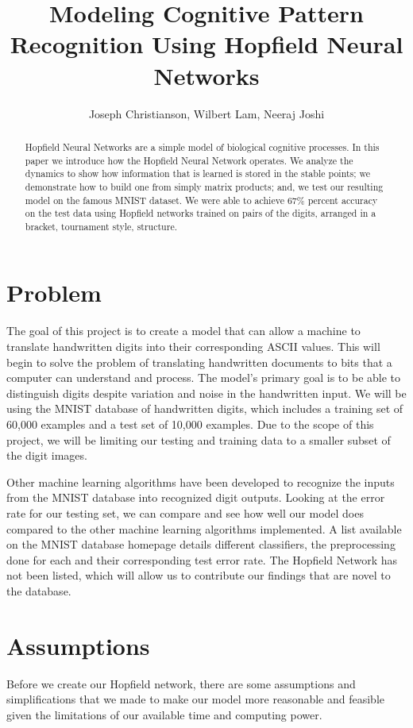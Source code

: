 \documentclass[]{article}
\title{Modeling Cognitive Pattern Recognition Using Hopfield Neural Networks}
\author{Joseph Christianson, Wilbert Lam, Neeraj Joshi}
\theoremstyle{plain}
\theoremstyle{definition}
\begin{document}
\maketitle

\begin{abstract}
Hopfield Neural Networks are a simple model of biological cognitive processes. In this paper we introduce how the Hopfield Neural Network operates. We analyze the dynamics to show how information that is learned is stored in the stable points; we demonstrate how to build one from simply matrix products; and, we test our resulting model on the famous MNIST dataset. We were able to achieve 67\% percent accuracy on the test data using Hopfield networks trained on pairs of the digits, arranged in a bracket, tournament style, structure. 
\end{abstract}

\section{Problem}
The goal of this project is to create a model that can allow a machine to translate handwritten digits into their corresponding ASCII values. This will begin to solve the problem of translating handwritten documents to bits that a computer can understand and process. The model's primary goal is to be able to distinguish digits despite variation and noise in the handwritten input. We will be using the MNIST database of handwritten digits, which includes a training set of 60,000 examples and a test set of 10,000 examples. Due to the scope of this project, we will be limiting our testing and training data to a smaller subset of the digit images. 


Other machine learning algorithms have been developed to recognize the inputs from the MNIST database into recognized digit outputs. Looking at the error rate for our testing set, we can compare and see how well our model does compared to the other machine learning algorithms implemented. A list available on the MNIST database homepage details different classifiers, the preprocessing done for each and their corresponding test error rate. The Hopfield Network has not been listed, which will allow us to contribute our findings that are novel to the database. 

\section{Assumptions}
Before we create our Hopfield network, there are some assumptions and simplifications that we made to make our model more reasonable and feasible given the limitations of our available time and computing power.  
\end{document}
